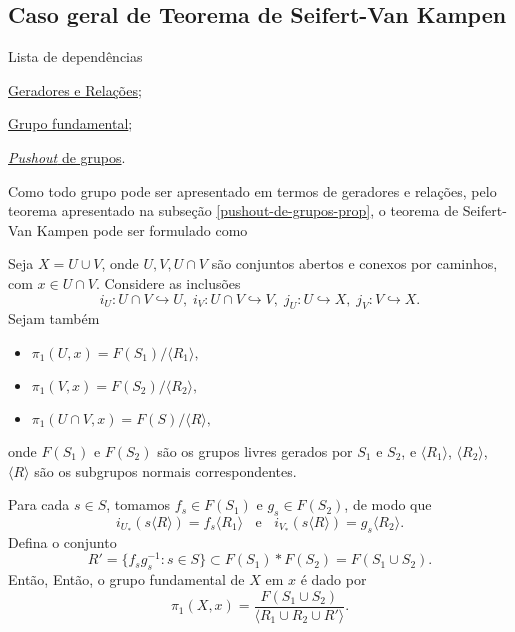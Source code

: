 \subsection{Caso geral de Teorema de Seifert-Van Kampen} %
\label{teorema-s-vk-caso-geral-prop}
\begin{titlemize}{Lista de dependências}
    \item \hyperref[geradores-relacoes-def]{Geradores e Relações};\\
	\item \hyperref[grupo-fundamental]{Grupo fundamental};\\
    \item \hyperref[pushout-de-grupos-prop]{\emph{Pushout} de grupos}.\\
\end{titlemize}

Como todo grupo pode ser apresentado em termos de geradores e relações, pelo teorema apresentado na subseção \ref{pushout-de-grupos-prop}, o teorema de Seifert-Van Kampen pode ser formulado como 
\begin{thm}
    Seja $X=U\cup V$, onde $U,V,U\cap V$ são conjuntos abertos e conexos por caminhos, com $x\in U\cap V$. Considere as inclusões 
    \[i_U:U\cap V\hookrightarrow U,\;i_V:U\cap V\hookrightarrow V,\;j_U:U\hookrightarrow X,\;j_V:V\hookrightarrow X.\]
    Sejam também
    \begin{itemize}
        \item $\pi_1(U,x)=F(S_1)/\langle R_1\rangle,$
        \item $\pi_1(V,x)=F(S_2)/\langle R_2\rangle,$
        \item $\pi_1(U\cap V,x)=F(S)/\langle R\rangle,$
    \end{itemize}
    onde $F(S_1)$ e $F(S_2)$ são os grupos livres gerados por $S_1$ e $S_2$, e $\langle R_1\rangle$, $\langle R_2\rangle$, $\langle R\rangle$ são os subgrupos normais correspondentes.

    Para cada $s\in S$, tomamos $f_s\in F(S_1)$ e $g_s\in F(S_2)$, de modo que
    \[i_{U_*}(s\langle R\rangle)=f_s\langle R_1\rangle\;\;\text{ e }\;\;i_{V_*}(s\langle R\rangle)=g_s\langle R_2\rangle.\]
    Defina o conjunto
    \[R'=\{f_sg^{-1}_s:s\in S\}\subset F(S_1)*F(S_2)=F(S_1\cup S_2).\]
    Então, Então, o grupo fundamental de $X$ em $x$ é dado por
    \[\pi_1(X,x)=\frac{F(S_1\cup S_2)}{\langle R_1\cup R_2\cup R' \rangle}.\]
\end{thm}
